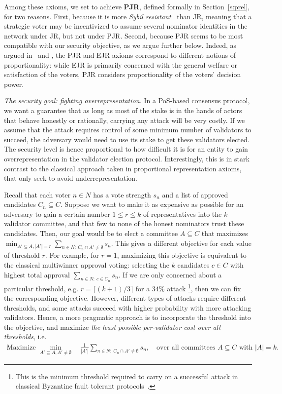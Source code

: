 Among these axioms, we set to achieve \textbf{PJR}, defined formally in Section~\ref{s:prel}, for two reasons. 
First, because it is more \emph{Sybil resistant}~\cite{douceur2002sybil} than JR, meaning that a strategic voter may be incentivized to assume several nominator identities in the network under JR, but not under PJR. 
Second, because PJR seems to be most compatible with our security objective, as we argue further below. Indeed, as argued in~\cite{peters2019proportionality} and \cite{lackner2020approval}, the PJR and EJR axioms correspond to different notions of proportionality: while EJR is primarily concerned with the general welfare or satisfaction of the voters, PJR considers proportionality of the voters' decision power. 

\emph{The security goal: fighting overrepresentation.} 
In a PoS-based consensus protocol, we want a guarantee that as long as most of the stake is in the hands of actors that behave honestly or rationally, carrying any attack will be very costly. If we assume that the attack requires control of some minimum number of validators to succeed, the adversary would need to use its stake to get these validators elected. The security level is hence proportional to how difficult it is for an entity to gain overrepresentation in the validator election protocol. 
Interestingly, this is in stark contrast to the classical approach taken in proportional representation axioms, that only seek to avoid underrepresentation. 

Recall that each voter $n\in N$ has a vote strength $s_n$ and a list of approved candidates $C_n\subseteq C$. 
Suppose we want to make it as expensive as possible for an adversary to gain a certain number $1\leq r\leq k$ of representatives into the $k$-validator committee, and that few to none of the honest nominators trust these candidates. Then, our goal would be to elect a committee $A\subseteq C$ that maximizes 
$\min_{A'\subseteq A, |A'|=r} \sum_{n\in N: \ C_n\cap A'\neq \emptyset} s_n$.
This gives a different objective for each value of threshold $r$. 
For example, for $r=1$, maximizing this objective is equivalent to the classical multiwinner approval voting: selecting the $k$ candidates $c\in C$ with highest total approval $\sum_{n\in N: \ c\in C_n} s_n$. 
If we are only concerned about a particular threshold, e.g. $r=\lceil(k+1)/3\rceil$ for a $34\%$ attack%
\footnote{This is the minimum threshold required to carry on a successful attack in classical Byzantine fault tolerant protocols~\cite{pease1980reaching}.}, 
then we can fix the corresponding objective. However, different types of attacks require different thresholds, and some attacks succeed with higher probability with more attacking validators. Hence, a more pragmatic approach is to incorporate the threshold into the objective, and maximize \emph{the least possible per-validator cost over all thresholds}, i.e.  
\begin{align}\label{eq:security}
    \text{Maximize } \min_{A'\subseteq A, A'\neq \emptyset} \quad \frac{1}{|A'|} \sum_{n\in N: \ C_n\cap A' \neq \emptyset} s_n, \quad \text{over all committees $A\subseteq C$ with $|A|=k$}.
\end{align}

